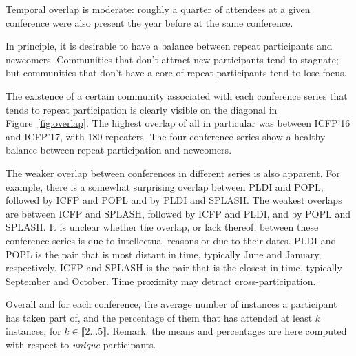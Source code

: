\begin{obs}
Temporal overlap is moderate: roughly a quarter of attendees at a given
conference were also present the year before at the same conference.
  \label{obs:overlap-temp}
\end{obs}

In principle, it is desirable to have a balance between repeat participants and
newcomers. Communities that don't attract new participants tend to stagnate; but
communities that don't have a core of repeat participants tend to lose focus.

The existence of a certain community associated with each conference series that
tends to repeat participation is clearly visible on the diagonal in
Figure~\ref{fig:overlap}. The highest overlap of all in particular was between
ICFP'16 and ICFP'17, with 180 repeaters. The four conference series show a
healthy balance between repeat participation and newcomers.

The weaker overlap between conferences in different series is also apparent.
For example, there is a somewhat surprising overlap between PLDI and
POPL, followed by ICFP and POPL and by PLDI and SPLASH. The weakest overlaps are
between ICFP and SPLASH, followed by ICFP and PLDI, and by POPL and SPLASH. It
is unclear whether the overlap, or lack thereof, between these conference series
is due to intellectual reasons or due to their dates. PLDI and POPL is the pair
that is most distant in time, typically June and January, respectively. ICFP and
SPLASH is the pair that is the closest in time, typically September and October.
Time proximity may detract cross-participation.

\begin{table}
\caption{Overall and for each conference, the average number of instances a
  participant has taken part of, and the percentage of them that has
  attended at least $k$ instances, for $k\in\llbracket 2 \dots 5
  \rrbracket$. Remark: the means and percentages are here computed with
  respect to \emph{unique} participants.}
\label{table:recurrent}
\end{table}


